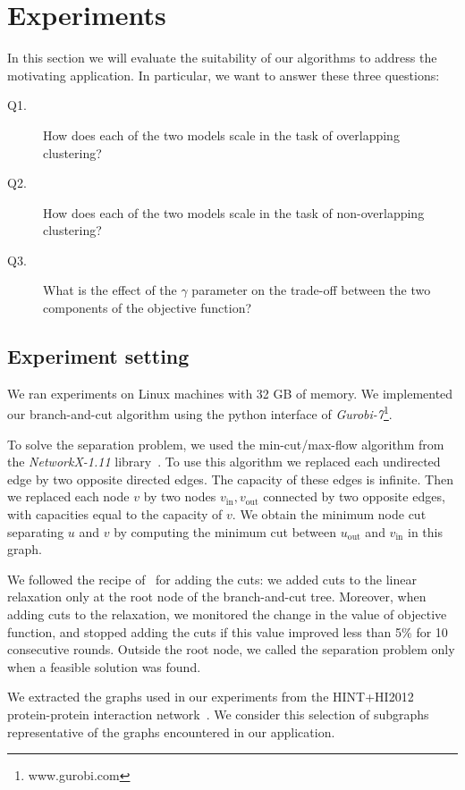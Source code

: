 \documentclass[conference]{IEEEtran}
\begin{document}
\section{Experiments}
\label{sec:experiments}

In this section we will evaluate the suitability of our algorithms to address the motivating application. In particular, we want to answer these three questions:

\begin{description}
\item[Q1.] How does each of the two models scale in the task of overlapping clustering?
\item[Q2.] How does each of the two models scale in the task of non-overlapping clustering?
\item[Q3.] What is the effect of the $\gamma$ parameter on the trade-off between the two components of the objective function?
\end{description}


\subsection{Experiment setting}
We ran experiments on Linux machines with 32 GB of memory. We implemented our branch-and-cut algorithm using the python interface
of \emph{Gurobi-7}\footnote{www.gurobi.com}.

To solve the separation problem, we used the min-cut/max-flow algorithm from the \emph{NetworkX-1.11} library~\cite{NetworkX}. To use this algorithm we replaced
each undirected edge by two opposite directed edges. The capacity of
these edges is infinite. Then we replaced each node $v$ by two
nodes $v_{\text{in}}, v_{\text{out}}$ connected by two opposite
edges, with capacities equal to the capacity of $v$. We obtain the
minimum node cut separating $u$ and $v$ by computing the minimum cut
between $u_{\text{out}}$ and $v_{\text{in}}$ in this graph.

We followed the recipe of~\cite{CarvajalCGVW13} for adding the cuts: we added cuts to the
linear relaxation only at the root node of the branch-and-cut tree.
Moreover, when adding cuts to the relaxation, we monitored the change in
the value of objective function, and stopped adding the cuts if this
value improved less than 5\% for 10 consecutive rounds. Outside the root
node, we called the separation problem only when a feasible solution was
found.

We extracted the graphs used in our experiments from the HINT+HI2012 protein-protein interaction network~\cite{das2012hint,yu2011next}. We consider this selection of subgraphs representative of the graphs encountered in our application.
\end{document}

